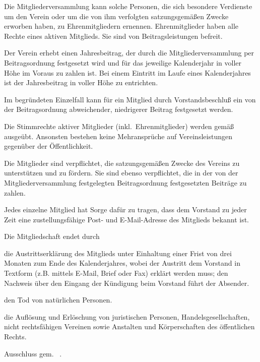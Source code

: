 \documentclass[draft]{scrartcl}
\begin{document}
\begin{contract}
Die Mitgliederversammlung kann solche Personen, die sich besondere Verdienste
um den Verein oder um die von ihm verfolgten satzungsgemäßen Zwecke erworben
haben, zu Ehrenmitgliedern ernennen. Ehrenmitglieder haben alle Rechte eines
aktiven Mitglieds. Sie sind von Beitragsleistungen befreit.


Der Verein erhebt einen Jahresbeitrag, der durch die Mitgliederversammlung
per Beitragsordnung festgesetzt wird und für das jeweilige Kalenderjahr in
voller Höhe im Voraus zu zahlen ist. Bei einem Eintritt im Laufe eines
Kalenderjahres ist der Jahresbeitrag in voller Höhe zu entrichten.

Im begründeten Einzelfall kann für ein Mitglied durch Vorstandsbeschluß ein
von der Beitragsordnung abweichender, niedrigerer Beitrag festgesetzt werden.


Die Stimmrechte aktiver Mitglieder (inkl.\ Ehrenmitglieder) werden gemäß
~ ausgeübt. Ansonsten bestehen
keine Mehransprüche auf Vereinsleistungen gegenüber der Öffentlichkeit.

Die Mitglieder sind verpflichtet, die satzungsgemäßen Zwecke des Vereins zu
unterstützen und zu fördern. Sie sind ebenso verpflichtet, die in der von der
Mitgliederversammlung festgelegten Beitragsordnung festgesetzten Beiträge zu
zahlen.

Jedes einzelne Mitglied hat Sorge dafür zu tragen, dass dem Vorstand zu jeder
Zeit eine zustellungsfähige Post- und E-Mail-Adresse des Mitglieds bekannt ist.


Die Mitgliedschaft endet durch

\begin{compactitem}
  \item die Austrittserklärung des Mitglieds unter Einhaltung einer Frist von
  drei Monaten zum Ende des Kalenderjahres, wobei der Austritt dem Vorstand in
  Textform (z.B. mittels E-Mail, Brief oder Fax) erklärt werden muss; den Nachweis
  über den Eingang der Kündigung beim Vorstand führt der Absender.
  \item den Tod von natürlichen Personen.
  \item die Auf\/lösung und Erlöschung von juristischen Personen, Handelsgesellschaften,
  nicht rechtsfähigen Vereinen sowie Anstalten und Körperschaften des öf\-fent\-lichen
  Rechts.
  \item Ausschluss gem. ~.
\end{compactitem}


\end{contract}
\end{document}
